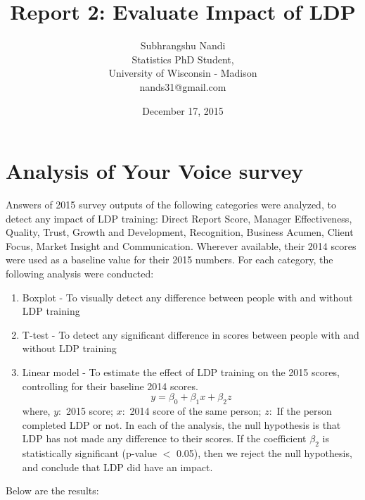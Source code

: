 \documentclass[11pt]{extarticle} %
\begin{document}

\title{Report 2: Evaluate Impact of LDP}
\author{Subhrangshu Nandi\\
  Statistics PhD Student, \\
  University of Wisconsin - Madison \\
  nands31@gmail.com}
\date{December 17, 2015}

\maketitle

\newpage
\section*{Analysis of Your Voice survey}
Answers of 2015 survey outputs of the following categories were analyzed, to detect any impact of LDP training:
Direct Report Score, Manager Effectiveness, Quality, Trust, Growth and Development, Recognition, Business Acumen, Client Focus, Market Insight and  Communication. Wherever available, their 2014 scores were used as a baseline value for their 2015 numbers. For each category, the following analysis were conducted:
\begin{enumerate}
\item Boxplot - To visually detect any difference between people with and without LDP training
\item T-test - To detect any significant difference in scores between people with and without LDP training
\item Linear model - To estimate the effect of LDP training on the 2015 scores, controlling for their baseline 2014 scores. 
\[ y = \beta_0 + \beta_1 x + \beta_2 z\]
where, $y: $ 2015 score; $x: $ 2014 score of the same person; $z: $ If the person completed LDP or not. In each of the analysis, the null hypothesis is that LDP has not made any difference to their scores. If the coefficient $\beta_2$ is statistically significant (p-value $<$ 0.05), then we reject the null hypothesis, and conclude that LDP did have an impact. 

\end{enumerate}
Below are the results: \\
\end{document}
